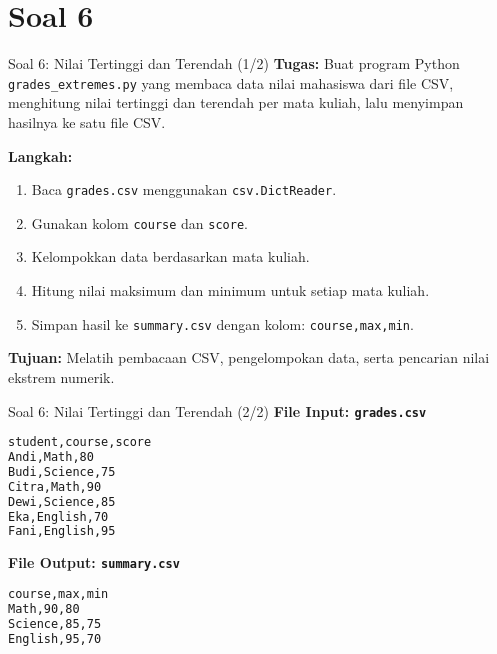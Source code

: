 \documentclass[aspectratio=169, table]{beamer}
\begin{document}
\section{Soal 6}
\begin{frame}[fragile]{Soal 6: Nilai Tertinggi dan Terendah (1/2)}
\vspace{15pt}
\textbf{Tugas:}  
Buat program Python \texttt{grades\_extremes.py} yang membaca data nilai mahasiswa dari file CSV, menghitung nilai tertinggi dan terendah per mata kuliah, lalu menyimpan hasilnya ke satu file CSV.

\textbf{Langkah:}
\begin{enumerate}
  \item Baca \texttt{grades.csv} menggunakan \texttt{csv.DictReader}.
  \item Gunakan kolom \texttt{course} dan \texttt{score}.
  \item Kelompokkan data berdasarkan mata kuliah.
  \item Hitung nilai maksimum dan minimum untuk setiap mata kuliah.
  \item Simpan hasil ke \texttt{summary.csv}  
        dengan kolom: \texttt{course,max,min}.
\end{enumerate}

\textbf{Tujuan:}  
Melatih pembacaan CSV, pengelompokan data, serta pencarian nilai ekstrem numerik.
\end{frame}

\begin{frame}[fragile]{Soal 6: Nilai Tertinggi dan Terendah (2/2)}
\vspace{15pt}
\textbf{File Input: \texttt{grades.csv}}
\begin{lstlisting}[language=bash,basicstyle=\ttfamily\small]
student,course,score
Andi,Math,80
Budi,Science,75
Citra,Math,90
Dewi,Science,85
Eka,English,70
Fani,English,95
\end{lstlisting}

\textbf{File Output: \texttt{summary.csv}}
\begin{lstlisting}[language=bash,basicstyle=\ttfamily\small]
course,max,min
Math,90,80
Science,85,75
English,95,70
\end{lstlisting}
\end{frame}
\end{document}

